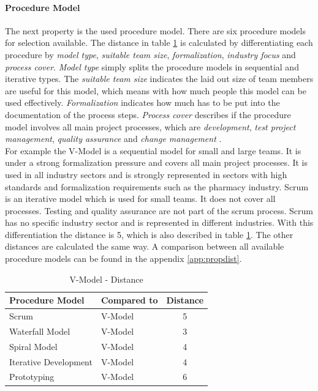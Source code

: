 \paragraph*{\textbf{Procedure Model}}
The next property is the used procedure model. There are six procedure models for selection available. The distance in table \ref{property:proceduremodel} is calculated by differentiating each procedure by \textit{model type}, \textit{suitable team size}, \textit{formalization}, \textit{industry focus} and \textit{process cover}. \textit{Model type} simply splits the procedure models in sequential and iterative types. The \textit{suitable team size} indicates the laid out size of team members are useful for this model, which means with how much people this model can be used effectively. \textit{Formalization} indicates how much has to be put into the documentation of the process steps. \textit{Process cover} describes if the procedure model involves all main project processes, which are \textit{development}, \textit{test project management}, \textit{quality assurance} and \textit{change management} \cite{incom}.\\
For example the V-Model is a sequential model for small and large teams. It is under a strong formalization pressure and covers all main project processes. It is used in all industry sectors and is strongly represented in sectors with high standards and formalization requirements such as the pharmacy industry. Scrum is an iterative model which is used for small teams. It does not cover all processes. Testing and quality assurance are not part of the scrum process. Scrum has no specific industry sector and is represented in different industries. With this differentiation the distance is 5, which is also described in table \ref{property:proceduremodel}. The other distances are calculated the same way. A comparison between all available procedure models can be found in the appendix \ref{app:propdist}.
\begin{table}[h]
	\centering 
	\setlength{\tabcolsep}{4pt}
	\begin{tabular}{|l|l|c|}\hline
		Procedure Model			& Compared to 	&  Distance 	\\ \hline
		Scrum   				& V-Model		& 5      		\\ \hline
		Waterfall Model   		& V-Model 		& 3      		\\ \hline
		Spiral Model   			& V-Model 		& 4     		\\ \hline
		Iterative Development   & V-Model 		& 4     		\\ \hline
		Prototyping  			& V-Model 		& 6     		\\ \hline
	\end{tabular} 
	\caption{V-Model - Distance} 
	\label{property:proceduremodel} 
\end{table}


